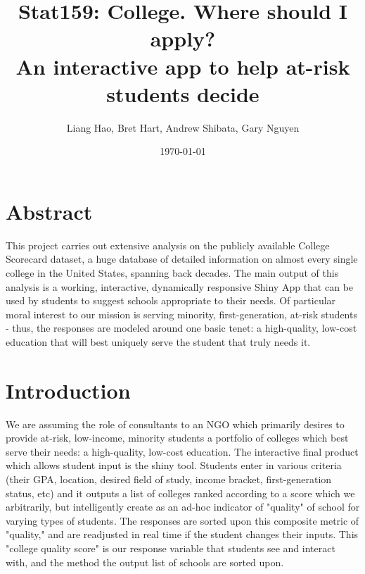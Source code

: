 \documentclass{article}\usepackage[]{graphicx}\usepackage[]{color}
\title{Stat159: College. Where should I apply? \\ An interactive app to help at-risk students decide}
\author{Liang Hao, Bret Hart, Andrew Shibata, Gary Nguyen}
\date{\today}
\begin{document}
\maketitle
\section{Abstract}

This project carries out extensive analysis on the publicly available College Scorecard dataset, a huge database of detailed information on almost every single college in the United States, spanning back decades. The main output of this analysis is a working, interactive, dynamically responsive Shiny App that can be used by students to suggest schools appropriate to their needs. Of particular moral interest to our mission is serving minority, first-generation, at-risk students - thus, the responses are modeled around one basic tenet: a high-quality, low-cost education that will best uniquely serve the student that truly needs it.


\maketitle
\section{Introduction}

We are assuming the role of consultants to an NGO which primarily desires to provide at-risk, low-income, minority students a portfolio of colleges which best serve their needs: a high-quality, low-cost education. The interactive final product which allows student input is the shiny tool. Students enter in various criteria (their GPA, location, desired field of study, income bracket, first-generation status, etc) and it outputs a list of colleges ranked according to a score which we arbitrarily, but intelligently create as an ad-hoc indicator of "quality" of school for varying types of students. The responses are sorted upon this composite metric of "quality," and are readjusted in real time if the student changes their inputs. This "college quality score" is our response variable that students see and interact with, and the method the output list of schools are sorted upon. 
\end{document}

